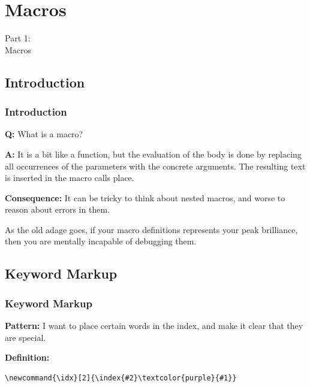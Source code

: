 {
\renewcommand{\bgcolor}{macros}

\section{Macros}
\begin{frame}
  \vspace{25mm}
  \begin{center}
    \Huge{Part 1\pause:\\Macros}
  \end{center}
\end{frame}

\subsection{Introduction}
\begin{frame}[fragile]
  \frametitle{Introduction}
  \vspace{3mm}
  \textbf{Q:} What is a macro?
  
  \pause
  \vspace{5mm}
  \textbf{A:} It is a bit like a function, but the evaluation of the body is done by replacing all occurrences of the parameters with the concrete arguments. The resulting text is inserted in the macro calls place.
  
  \pause
  \vspace{5mm}
  \textbf{Consequence:} It can be tricky to think about nested macros, and worse to reason about errors in them.
  
  \pause
  \vspace{5mm}
  As the old adage goes, if your macro definitions represents your peak brilliance, then you are mentally incapable of debugging them.
\end{frame}

\subsection{Keyword Markup}
\begin{frame}[fragile]
  \frametitle{Keyword Markup}
  \vspace{3mm}
  \textbf{Pattern:} I want to place certain words in the index, and make it clear that they are special.
  
  \pause
  \vspace{5mm}
  \textbf{Definition:}
  \begin{verbatim}
\newcommand{\idx}[2]{\index{#2}\textcolor{purple}{#1}}
  \end{verbatim}
  

\end{frame}}
